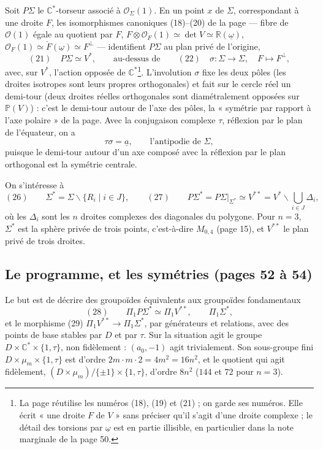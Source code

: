 \documentclass[11pt,a4paper]{article}
\begin{document}
Soit $P\Sigma$ le $\mathbb{C}^{*}$-torseur associé à $\mathcal{O}_\Sigma(1)$.
En un point $x$ de $\Sigma$, correspondant à une droite $F$, les isomorphismes
canoniques (18)--(20) de la page — fibre de $\mathcal{O}(1)$ égale au quotient
par $F$, $F \otimes \mathcal{O}_F(1) \simeq \det V \simeq
\mathbb{R}(\underline{\omega})$, $\mathcal{O}_F(1) \simeq \check
F(\underline{\omega}) \simeq F^{\perp}$ — identifient $P\Sigma$ au plan privé de
l'origine,
\[
(21)\quad P\Sigma \simeq V^{*}, \qquad \text{au-dessus de} \qquad
(22)\quad \sigma : \Sigma \to \Sigma, \quad F \mapsto F^{\perp},
\]
avec, sur $V^{*}$, l'action opposée de $\mathbb{C}^{*}$\footnote{La page
réutilise les numéros (18), (19) et (21) ; on garde ses numéros. Elle écrit
« une droite $F$ de $V$ » sans préciser qu'il s'agit d'une droite complexe ;
le détail des torsions par $\underline{\omega}$ est en partie illisible, en
particulier dans la note marginale de la page 50.}. L'involution $\sigma$
fixe les deux pôles (les droites isotropes sont leurs propres orthogonales) et
fait sur le cercle réel un demi-tour (deux droites réelles orthogonales sont
diamétralement opposées sur $\mathbb{P}(V)$) : c'est le demi-tour autour de
l'axe des pôles, la « symétrie par rapport à l'axe polaire » de la page. Avec la
conjugaison complexe $\tau$, réflexion par le plan de l'équateur, on a
\[
\tau\sigma = \underline{a}, \qquad \text{l'antipodie de } \Sigma,
\]
puisque le demi-tour autour d'un axe composé avec la réflexion par le plan
orthogonal est la symétrie centrale.

On s'intéresse à
\[
(26)\qquad \Sigma^{*} = \Sigma \smallsetminus \{ R_i \mid i \in J \}, \qquad
(27)\qquad P\Sigma^{*} = P\Sigma|_{\Sigma^{*}} \simeq V^{**} = V^{*}
\smallsetminus \bigcup_{i \in J} \Delta_i,
\]
où les $\Delta_i$ sont les $n$ droites complexes des diagonales du
polygone. Pour $n = 3$, $\Sigma^{*}$ est la sphère privée de trois points,
c'est-à-dire $M_{0,4}$ (page 15), et $V^{**}$ le plan privé de trois droites.

\subsection*{Le programme, et les symétries (pages 52 à 54)}

Le but est de décrire des groupoïdes équivalents aux groupoïdes fondamentaux
\[
(28)\qquad \Pi_1 P\Sigma^{*} \simeq \Pi_1 V^{**}, \qquad \Pi_1 \Sigma^{*},
\]
et le morphisme (29) $\Pi_1 V^{**} \to \Pi_1 \Sigma^{*}$, par générateurs et
relations, avec des points de base stables par $D$ et par $\tau$. Sur la
situation agit le groupe $D \times \mathbb{C}^{*} \times \{1, \tau\}$, non
fidèlement : $(a_0, -1)$ agit trivialement. Son sous-groupe fini $D \times
\mu_m \times \{1, \tau\}$ est d'ordre $2m \cdot m \cdot 2 = 4m^2 = 16 n^2$, et
le quotient qui agit fidèlement, $(D \times \mu_m)/\{\pm1\} \times \{1,
\tau\}$, d'ordre $8n^2$ ($144$ et $72$ pour $n = 3$).
\end{document}
